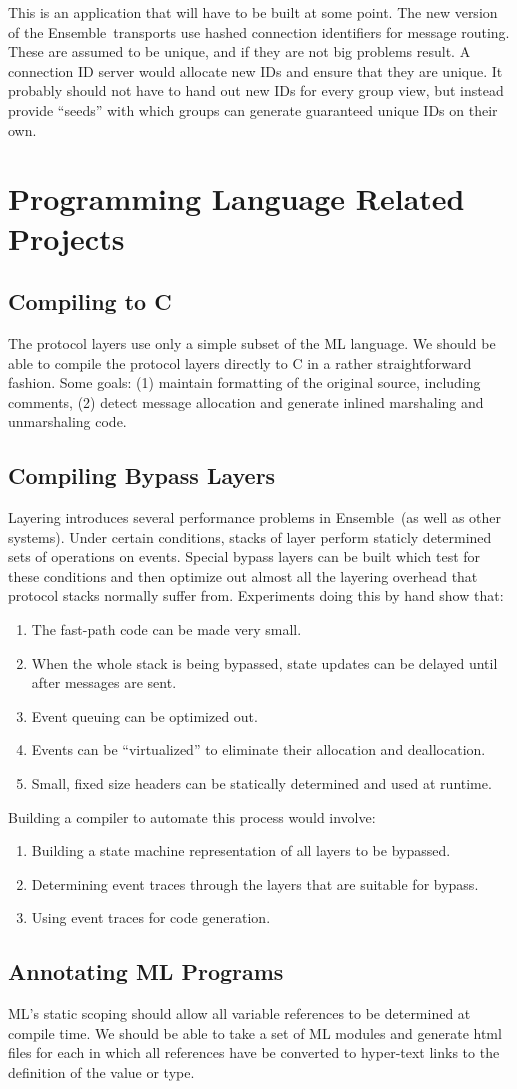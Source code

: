 \documentclass{article}
\newcommand {\ensemble}[0]	{Ensemble}
\newcommand {\project}[1]	{\subsection{#1}}
\begin{document}
This is an application that will have to be built at some point.  The new
version of the \ensemble\ transports use hashed connection identifiers for
message routing.  These are assumed to be unique, and if they are not big
problems result.  A connection ID server would allocate new IDs and ensure
that they are unique.  It probably should not have to hand out new IDs for
every group view, but instead provide ``seeds'' with which groups can
generate guaranteed unique IDs on their own.

\section{Programming Language Related Projects}
\project{Compiling to C}
The protocol layers use only a simple subset of the ML language.  We should
be able to compile the protocol layers directly to C in a rather
straightforward fashion.  Some goals: (1) maintain formatting of the
original source, including comments, (2) detect message allocation and
generate inlined marshaling and unmarshaling code.

\project{Compiling Bypass Layers}
Layering introduces several performance problems in \ensemble\ (as well as other
systems).  Under certain conditions, stacks of layer perform staticly
determined sets of operations on events.  Special bypass layers can be
built which test for these conditions and then optimize out almost all the
layering overhead that protocol stacks normally suffer from.  Experiments
doing this by hand show that:
\begin{enumerate}
\item
The fast-path code can be made very small.
\item 
When the whole stack is being bypassed, state updates can be delayed until
after messages are sent.
\item
Event queuing can be optimized out.
\item
Events can be ``virtualized'' to eliminate their allocation and
deallocation.
\item 
Small, fixed size headers can be statically determined and used at runtime.
\end{enumerate}
Building a compiler to automate this process would involve:
\begin{enumerate}
\item 
Building a state machine representation of all layers to be bypassed.
\item 
Determining event traces through the layers that are suitable for bypass.
\item 
Using event traces for code generation.
\end{enumerate}

\project{Annotating ML Programs}
ML's static scoping should allow all variable references to be determined
at compile time.  We should be able to take a set of ML modules and
generate html files for each in which all references have be converted to
hyper-text links to the definition of the value or type.
\end{document}
